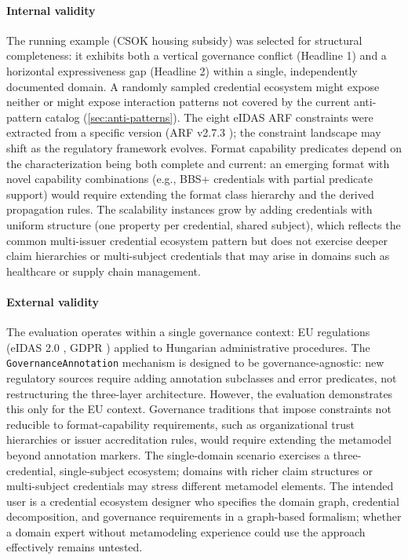 \paragraph{Internal validity}\label{internal-validity}

The running example (CSOK housing subsidy) was selected for structural completeness: it exhibits both a vertical governance conflict (Headline 1) and a horizontal expressiveness gap (Headline 2) within a single, independently documented domain. A randomly sampled credential ecosystem might expose neither or might expose interaction patterns not covered by the current anti-pattern catalog (\autoref{sec:anti-patterns}). The eight eIDAS ARF constraints were extracted from a specific version (ARF v2.7.3 \citep{noauthor_eu-digital-identity-walleteudi-doc-architecture-and-reference-framework_2026}); the constraint landscape may shift as the regulatory framework evolves. Format capability predicates depend on the characterization being both complete and current: an emerging format with novel capability combinations (e.g., BBS+ credentials with partial predicate support) would require extending the format class hierarchy and the derived propagation rules. The scalability instances grow by adding credentials with uniform structure (one property per credential, shared subject), which reflects the common multi-issuer credential ecosystem pattern but does not exercise deeper claim hierarchies or multi-subject credentials that may arise in domains such as healthcare or supply chain management.

\paragraph{External validity}\label{external-validity}

The evaluation operates within a single governance context: EU regulations (eIDAS 2.0 \citep{noauthor_eu-digital-identity-walleteudi-doc-architecture-and-reference-framework_2026}, GDPR \citep{gdpr}) applied to Hungarian administrative procedures. The \texttt{GovernanceAnnotation} mechanism is designed to be governance-agnostic: new regulatory sources require adding annotation subclasses and error predicates, not restructuring the three-layer architecture. However, the evaluation demonstrates this only for the EU context. Governance traditions that impose constraints not reducible to format-capability requirements, such as organizational trust hierarchies or issuer accreditation rules, would require extending the metamodel beyond annotation markers. The single-domain scenario exercises a three-credential, single-subject ecosystem; domains with richer claim structures or multi-subject credentials may stress different metamodel elements. The intended user is a credential ecosystem designer who specifies the domain graph, credential decomposition, and governance requirements in a graph-based formalism; whether a domain expert without metamodeling experience could use the approach effectively remains untested.

